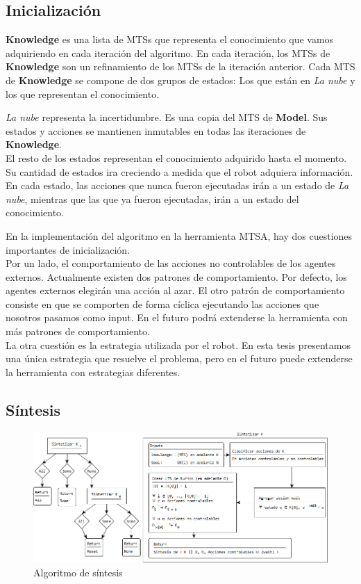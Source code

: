 \subsection{Inicialización}

\textbf{Knowledge} es una lista de MTSs que representa el conocimiento que vamos adquiriendo en cada iteración del algoritmo. En cada iteración, los MTSs
de \textbf{Knowledge} son un refinamiento de los MTSs de la iteración anterior. Cada MTS de \textbf{Knowledge} se compone de dos grupos de estados: Los
que están en \textit{La nube} y los que representan el conocimiento.

\vspace{\baselineskip}
\textit{La nube} representa la incertidumbre. Es una copia del MTS de \textbf{Model}. Sus estados y acciones se mantienen inmutables en todas las 
iteraciones de \textbf{Knowledge}.\\
El resto de los estados representan el conocimiento adquirido hasta el momento. Su cantidad de estados ira creciendo a medida que el robot adquiera información.
En cada estado, las acciones que nunca fueron ejecutadas irán a un estado de \textit{La nube}, mientras que las que ya fueron ejecutadas, irán a un estado del
conocimiento.

\vspace{\baselineskip}
En la implementación del algoritmo en la herramienta MTSA, hay dos cuestiones importantes de inicialización.\\
Por un lado, el comportamiento de las acciones no controlables de los agentes externos. Actualmente existen dos patrones de comportamiento.
Por defecto, los agentes externos elegirán una acción al azar. El otro patrón de comportamiento consiste en que se comporten de forma cíclica ejecutando
las acciones que nosotros pasamos como input. En el futuro podrá extenderse la herramienta con más patrones de comportamiento.\\
La otra cuestión es la estrategia utilizada por el robot. En esta tesis presentamos una única estrategia que resuelve el problema, pero en el futuro puede
extenderse la herramienta con estrategias diferentes.

\subsection{Síntesis}

\begin{figure}[H]
  \centering
    \includegraphics[width=1.0\textwidth]{Imagenes/Algoritmo/Algoritmo_sintetizar.png}
  \caption{Algoritmo de síntesis}
  \label{fig:Algoritmo_sintetizar}
\end{figure}

